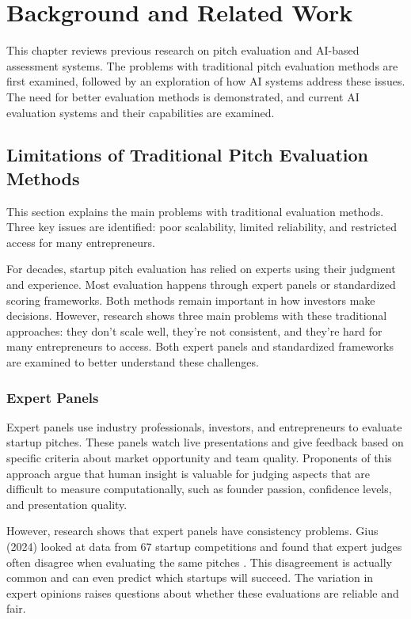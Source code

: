 \chapter{Background and Related Work}
\label{ch:soa}

This chapter reviews previous research on pitch evaluation and AI-based assessment systems. The problems with traditional pitch evaluation methods are first examined, followed by an exploration of how AI systems address these issues. The need for better evaluation methods is demonstrated, and current AI evaluation systems and their capabilities are examined.

\section{Limitations of Traditional Pitch Evaluation Methods}
\label{sec:traditional-methods}

This section explains the main problems with traditional evaluation methods. Three key issues are identified: poor scalability, limited reliability, and restricted access for many entrepreneurs.

For decades, startup pitch evaluation has relied on experts using their judgment and experience. Most evaluation happens through expert panels or standardized scoring frameworks. Both methods remain important in how investors make decisions. However, research shows three main problems with these traditional approaches: they don't scale well, they're not consistent, and they're hard for many entrepreneurs to access. Both expert panels and standardized frameworks are examined to better understand these challenges.

\subsection{Expert Panels}\label{subsec:expert-panels}
Expert panels use industry professionals, investors, and entrepreneurs to evaluate startup pitches. These panels watch live presentations and give feedback based on specific criteria about market opportunity and team quality. Proponents of this approach argue that human insight is valuable for judging aspects that are difficult to measure computationally, such as founder passion, confidence levels, and presentation quality.

However, research shows that expert panels have consistency problems. Gius (2024) looked at data from 67 startup competitions and found that expert judges often disagree when evaluating the same pitches \cite{Gius2024}. This disagreement is actually common and can even predict which startups will succeed. The variation in expert opinions raises questions about whether these evaluations are reliable and fair.

